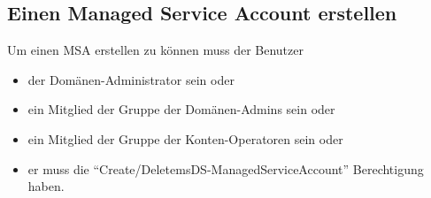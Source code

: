      \subsection{Einen Managed Service Account erstellen}
        \begin{merke}
          Um einen MSA erstellen zu können muss der Benutzer
          \begin{itemize}
              \item der Domänen-Administrator sein oder
              \item ein Mitglied der Gruppe der Domänen-Admins sein oder
              \item ein Mitglied der Gruppe der Konten-Operatoren sein oder
              \item er muss die \enquote{Create/DeletemsDS-ManagedServiceAccount}
              Berechtigung haben.
          \end{itemize}
        \end{merke}
